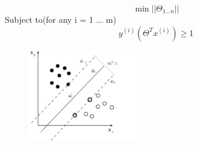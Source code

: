 \documentclass{article}
\begin{document}
\begin{equation}
\min ||\Theta_{1 \ldots n}||
\end{equation}
Subject to(for any i = 1 $\ldots$ m)\\
\begin{equation}\label{}
y^{(i)}(\Theta^{T}x^{(i)}) \ge 1
\end{equation}
\begin{figure}[ht]
  \centering
  \includegraphics[width=5cm]{Figure2.jpg}\\
  \caption{}\label{hyper-plane-example2}
\end{figure}

\newpage
\end{document}
